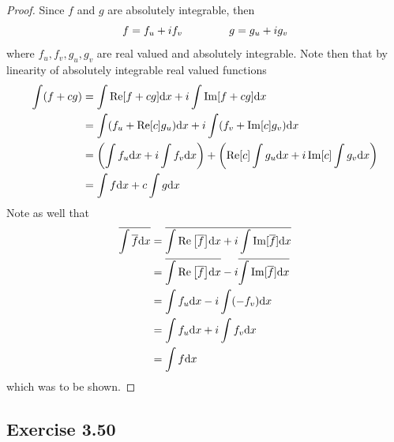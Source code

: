 \documentclass[hw_all.tex]{subfiles}
\begin{document}
\begin{proof}
    Since $f$ and $g$ are absolutely integrable, then
    \[
        f = f_u + i f_v \hspace{1.5cm} g = g_u + i g_v
    \]
    where $f_u, f_v, g_u, g_v$ are real valued and absolutely integrable. Note then that by linearity of absolutely integrable real valued functions
    \begin{align*}
        \int (f + cg) &= \int \Re[f + cg] \dd x + i \int \Im[f + cg] \dd x \\
                      &= \int (f_u + \Re[c] g_u) \dd x + i \int (f_v + \Im[c] g_v) \dd x \\
                      &= \qty(\int f_u \dd x + i \int f_v \dd x) + \qty(\Re[c] \int g_u \dd x + i \Im[c] \int g_v \dd x) \\
                      &= \int f \dd x + c \int g \dd x
    \end{align*}
    Note as well that
    \begin{align*}
        \overline{\int \overline{f} \dd x} &= \overline{\int \Re\qty[\overline{f}] \dd x + i \int \Im[\overline{f}] \dd x} \\
                                   &= \overline{\int \Re\qty[\overline{f}] \dd x} - i \overline{\int \Im[\overline{f}] \dd x} \\
                                   &= \int f_u \dd x - i \int (-f_v) \dd x \\
                                   &= \int f_u \dd x + i \int f_v \dd x \\
                                   &= \int f \dd x
    \end{align*}
    which was to be shown.
\end{proof}

\subsection{Exercise 3.50}
\end{document}
